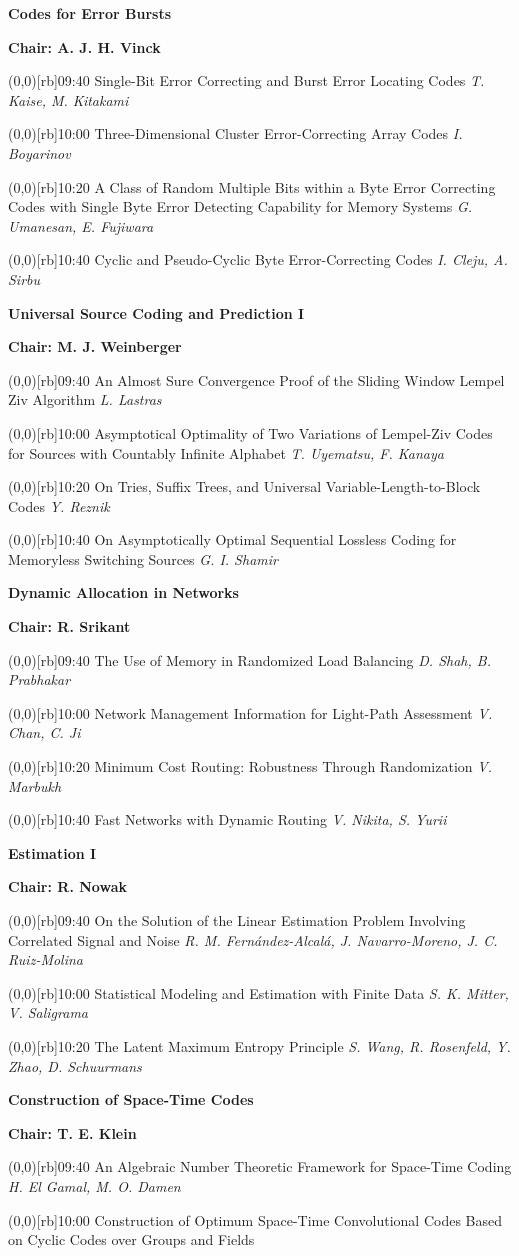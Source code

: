 \documentclass[a5paper,twoside]{article}
\def\sesstitle#1{\vspace{.45\bigskipamount}\par{\bfseries #1}\par}
\def\sesschair#1{{\bfseries Chair: #1}\par\vspace{.65\medskipamount}}
\def\papertime#1{\makebox(0,0)[rb]{{\scriptsize #1}\hspace{.5em}}}
\def\papertitle#1{#1\hfil\break}
\def\paperauthors#1{{\itshape #1}\par\filbreak\vspace{.65\medskipamount}}
\begin{document}
\sesstitle{Codes for Error Bursts}
\sesschair{A. J. H. Vinck}
\papertime{09:40}%
\papertitle{Single-Bit Error Correcting and Burst Error Locating Codes}
\paperauthors{T. Kaise, M. Kitakami}
\papertime{10:00}%
\papertitle{Three-Dimensional Cluster Error-Correcting Array Codes}
\paperauthors{I. Boyarinov}
\papertime{10:20}%
\papertitle{A Class of Random Multiple Bits within a Byte Error Correcting Codes with Single Byte Error Detecting Capability for Memory Systems}
\paperauthors{G. Umanesan, E. Fujiwara}
\papertime{10:40}%
\papertitle{Cyclic and Pseudo-Cyclic Byte Error-Correcting Codes}
\paperauthors{I. Cleju, A. Sirbu}
\sesstitle{Universal Source Coding and Prediction I}
\sesschair{M. J. Weinberger}
\papertime{09:40}%
\papertitle{An Almost Sure Convergence Proof of the Sliding Window Lempel Ziv Algorithm}
\paperauthors{L. Lastras}
\papertime{10:00}%
\papertitle{Asymptotical Optimality of Two Variations of Lempel-Ziv Codes for Sources with Countably Infinite Alphabet}
\paperauthors{T. Uyematsu, F. Kanaya}
\papertime{10:20}%
\papertitle{On Tries, Suffix Trees, and Universal Variable-Length-to-Block Codes}
\paperauthors{Y. Reznik}
\papertime{10:40}%
\papertitle{On Asymptotically Optimal Sequential Lossless Coding for Memoryless Switching Sources}
\paperauthors{G. I. Shamir}
\sesstitle{Dynamic Allocation in Networks}
\sesschair{R. Srikant}
\papertime{09:40}%
\papertitle{The Use of Memory in Randomized Load Balancing}
\paperauthors{D. Shah, B. Prabhakar}
\papertime{10:00}%
\papertitle{Network Management Information for Light-Path Assessment}
\paperauthors{V. Chan, C. Ji}
\papertime{10:20}%
\papertitle{Minimum Cost Routing: Robustness Through Randomization}
\paperauthors{V. Marbukh}
\papertime{10:40}%
\papertitle{Fast Networks with Dynamic Routing}
\paperauthors{V. Nikita, S. Yurii}
\sesstitle{Estimation I}
\sesschair{R. Nowak}
\papertime{09:40}%
\papertitle{On the Solution of the Linear Estimation Problem Involving Correlated Signal and Noise}
\paperauthors{R. M. Fern\'andez-Alcal\'a, J. Navarro-Moreno, J. C. Ruiz-Molina}
\papertime{10:00}%
\papertitle{Statistical Modeling and Estimation with Finite Data}
\paperauthors{S. K. Mitter, V. Saligrama}
\papertime{10:20}%
\papertitle{The Latent Maximum Entropy Principle}
\paperauthors{S. Wang, R. Rosenfeld, Y. Zhao, D. Schuurmans}
\sesstitle{Construction of Space-Time Codes}
\sesschair{T. E. Klein}
\papertime{09:40}%
\papertitle{An Algebraic Number Theoretic Framework for Space-Time Coding}
\paperauthors{H. El Gamal, M. O. Damen}
\papertime{10:00}%
\papertitle{Construction of Optimum Space-Time Convolutional Codes Based on Cyclic Codes over Groups and Fields}
\end{document}
